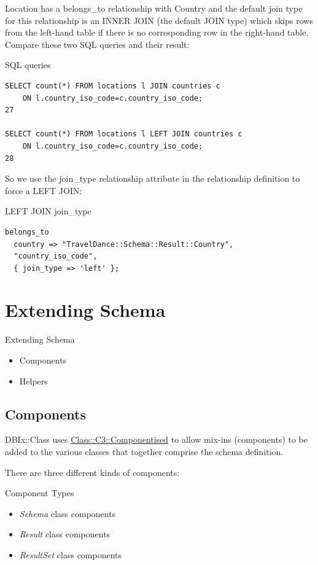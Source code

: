 Location has a belongs\_to relationship with Country and the default join
type for this relationship is an INNER JOIN (the default JOIN type) which
skips rows from the left-hand table if there is no corresponding row in the
right-hand table. Compare these two SQL queries and their result: 

\begin{frame}[fragile]{SQL queries}
\begin{lstlisting}
SELECT count(*) FROM locations l JOIN countries c
    ON l.country_iso_code=c.country_iso_code;
27

SELECT count(*) FROM locations l LEFT JOIN countries c
    ON l.country_iso_code=c.country_iso_code;
28
\end{lstlisting}
\end{frame}

So we use the join\_type relationship attribute in the relationship definition to force a LEFT JOIN:

\begin{frame}[fragile]{LEFT JOIN join\_type}
\begin{lstlisting}
belongs_to
  country => "TravelDance::Schema::Result::Country",
  "country_iso_code",
  { join_type => 'left' };
\end{lstlisting}
\end{frame}

\section{Extending Schema}
\begin{frame}{Extending Schema}
\begin{itemize}
\item Components
\item Helpers
\end{itemize}
\end{frame}

\subsection{Components}
DBIx::Class uses \href{https://metacpan.org/pod/Class::C3::Componentised}
{Class::C3::Componentised} to allow mix-ins (components) to be added to the 
various classes that together comprise the schema definition. 

There are three different kinds of components:

\begin{frame}{Component Types}
\begin{itemize}
\item \emph{Schema} class components
\item \emph{Result} class components
\item \emph{ResultSet} class components
\end{itemize}
\end{frame}
 
